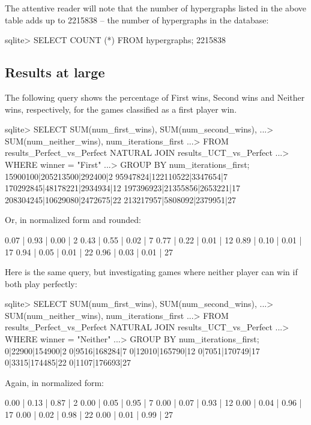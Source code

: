 The attentive reader will note that the number of hypergraphs listed in the above table adds up to 2215838 -- the number of hypergraphs in the database:
\begin{code}
sqlite> SELECT COUNT (*) FROM hypergraphs;
2215838
\end{code}

\subsection{Results at large}

The following query shows the percentage of First wins, Second wins and Neither wins, respectively, for the games classified as a first player win.
\begin{code}
sqlite> SELECT SUM(num_first_wins), SUM(num_second_wins),
   ...>        SUM(num_neither_wins), num_iterations_first
   ...> FROM results_Perfect_vs_Perfect NATURAL JOIN results_UCT_vs_Perfect
   ...> WHERE winner = "First"
   ...> GROUP BY num_iterations_first;
15900100|205213500|292400|2
95947824|122110522|3347654|7
170292845|48178221|2934934|12
197396923|21355856|2653221|17
208304245|10629080|2472675|22
213217957|5808092|2379951|27
\end{code}
Or, in normalized form and rounded:
\begin{code}
0.07 | 0.93 | 0.00 | 2
0.43 | 0.55 | 0.02 | 7
0.77 | 0.22 | 0.01 | 12
0.89 | 0.10 | 0.01 | 17
0.94 | 0.05 | 0.01 | 22
0.96 | 0.03 | 0.01 | 27
\end{code}

Here is the same query, but investigating games where neither player can win if both play perfectly:

\begin{code}
sqlite> SELECT SUM(num_first_wins), SUM(num_second_wins),
   ...>        SUM(num_neither_wins), num_iterations_first
   ...> FROM results_Perfect_vs_Perfect NATURAL JOIN results_UCT_vs_Perfect
   ...> WHERE winner = "Neither"
   ...> GROUP BY num_iterations_first;
0|22900|154900|2
0|9516|168284|7
0|12010|165790|12
0|7051|170749|17
0|3315|174485|22
0|1107|176693|27
\end{code}

Again, in normalized form:

\begin{code}
0.00 | 0.13 | 0.87 | 2
0.00 | 0.05 | 0.95 | 7
0.00 | 0.07 | 0.93 | 12
0.00 | 0.04 | 0.96 | 17
0.00 | 0.02 | 0.98 | 22
0.00 | 0.01 | 0.99 | 27
\end{code}

